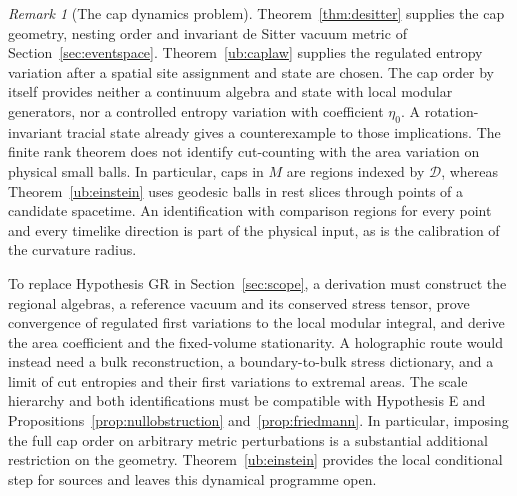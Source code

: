 \documentclass[aps,pra,onecolumn,superscriptaddress,nofootinbib,10pt]{revtex4-2}
\theoremstyle{definition}
\theoremstyle{remark}
\newtheorem{remark}[theorem]{Remark}
\begin{document}
\begin{remark}[The cap dynamics problem]\label{ub:programme}
Theorem~\ref{thm:desitter} supplies the cap geometry, nesting order
and invariant de Sitter vacuum metric of Section~\ref{sec:eventspace}.
Theorem~\ref{ub:caplaw} supplies the regulated entropy variation
after a spatial site assignment and state are chosen.
The cap order by itself provides neither a continuum algebra and
state with local modular generators, nor a controlled entropy
variation with coefficient $\eta_0$. A rotation-invariant tracial state
already gives a counterexample to those implications. The finite
rank theorem does not identify cut-counting with the area
variation on physical small balls. In particular, caps in $M$ are
regions indexed by $\mathcal D$, whereas Theorem~\ref{ub:einstein}
uses geodesic balls in rest slices through points of a candidate
spacetime. An identification with comparison regions for every
point and every timelike direction is part of the physical input,
as is the calibration of the curvature radius.

To replace Hypothesis GR in Section~\ref{sec:scope}, a derivation
must construct the regional algebras, a reference vacuum and its
conserved stress tensor, prove convergence of regulated first
variations to the local modular integral, and derive the area
coefficient and the fixed-volume stationarity. A holographic route
would instead need a bulk reconstruction, a boundary-to-bulk
stress dictionary, and a limit of cut entropies and their first
variations to extremal areas. The scale hierarchy and both
identifications must be compatible with Hypothesis E and
Propositions~\ref{prop:nullobstruction} and~\ref{prop:friedmann}.
In particular, imposing the full cap order on arbitrary metric
perturbations is a substantial additional restriction on the
geometry. Theorem~\ref{ub:einstein} provides the local conditional
step for sources and leaves this dynamical programme open.
\end{remark}
\end{document}
